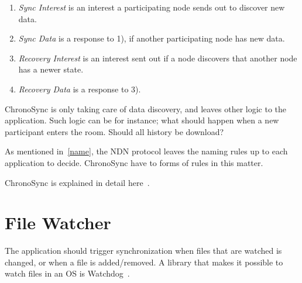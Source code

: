 \begin{enumerate}
  \item \textit{Sync Interest} is an interest a participating node sends out to discover new data.
  \item \textit{Sync Data} is a response to 1), if another participating node has new data.
  \item \textit{Recovery Interest} is an interest sent out if a node discovers that another node has a newer state.
  \item \textit{Recovery Data} is a response to 3).
\end{enumerate}

ChronoSync is only taking care of data discovery, and leaves other logic to the application. 
Such logic can be for instance; what should happen when a new participant enters the room.
Should all history be download?

As mentioned in~\autoref{name}, the \gls{NDN} protocol leaves the naming rules up to each application to decide.
ChronoSync have to forms of rules in this matter. 

ChronoSync is explained in detail here~\cite{DBLP:conf/icnp/ZhuA13}.

\section{File Watcher}
The application should trigger synchronization when files that are watched is changed, or when a file is added/removed.
A library that makes it possible to watch files in an \gls{OS} is Watchdog~\cite{watchdog}. 
